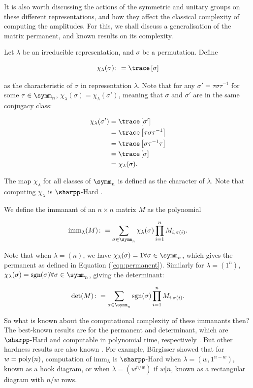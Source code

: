 It is also worth discussing the actions of the symmetric and unitary groups on these different representations, and how they affect the classical complexity of computing the amplitudes. For this, we shall discuss a generalisation of the matrix permanent, and known results on its complexity.

Let $\lambda$ be an irreducible representation, and $\sigma$ be a permutation. Define

\begin{equation}
\chi_\lambda(\sigma) \colon= \trace\left[\sigma\right]
\end{equation}

\noindent as the characteristic of $\sigma$ in representation $\lambda$. Note that for any $\sigma' = \tau\sigma\tau^{-1}$ for some $\tau \in \symm_n$, $\chi_\lambda(\sigma) = \chi_\lambda(\sigma')$, meaning that $\sigma$ and $\sigma'$ are in the same conjugacy class:

\begin{align}
\chi_\lambda(\sigma') &= \trace\left[\sigma'\right]\\
&= \trace\left[\tau\sigma\tau^{-1}\right]\\
&= \trace\left[\sigma\tau^{-1}\tau\right]\\
&= \trace\left[\sigma\right]\\
&= \chi_\lambda(\sigma).
\end{align}

The map $\chi_\lambda$ for all classes of $\symm_n$ is defined as the character of $\lambda$. Note that computing $\chi_\lambda$ is $\sharpp$-Hard \cite{hepler1994}.

We define the immanant of an $n\times n$ matrix $M$ as the polynomial

\begin{equation}
\textrm{imm}_\lambda(M) \colon= \sum_{\sigma\in\symm_n}\chi_\lambda(\sigma)\prod_{i=1}^nM_{i,\sigma(i)}.
\end{equation}

Note that when $\lambda=(n)$, we have $\chi_\lambda(\sigma)=1\forall\sigma\in\symm_n$, which gives the permanent as defined in Equation (\ref{eqn:permanent}). Similarly for $\lambda=(1^n)$, $\chi_\lambda(\sigma)=\textrm{sgn}(\sigma)\forall\sigma\in\symm_n$, giving the determinant:

\begin{equation}
\textrm{det}(M) \colon= \sum_{\sigma\in\symm_n}\textrm{sgn}(\sigma)\prod_{i=1}^nM_{i,\sigma(i)}.
\end{equation}

So what is known about the computational complexity of these immanants then? The best-known results are for the permanent and determinant, which are $\sharpp$-Hard and computable in polynomial time, respectively \cite{valiant1979, aaronson2011, fisikopoulos2016}. But other hardness results are also known \cite{hartmann1985, burgisser2000, brylinski2003, mertens2013}. For example, B\"urgisser \cite{burgisser2000immanants} showed that for $w=\operatorname{poly}(n)$, computation of $\textrm{imm}_\lambda$ is $\sharpp$-Hard when $\lambda=(w,1^{n-w})$, known as a hook diagram, or when $\lambda=(w^{n/w})$ if $w|n$, known as a rectangular diagram with $n/w$ rows.
